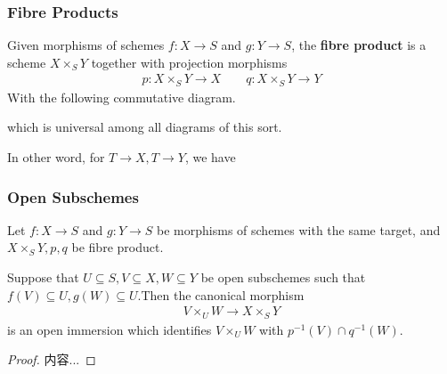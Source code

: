 \documentclass[Total.tex]{subfiles}
\begin{document}
				\subsubsection{Fibre Products}
					\begin{Def}
						Given morphisms of schemes $f:X\rightarrow S$ and $g:Y\rightarrow S$, the \textbf{fibre product} is a scheme $X\times_S Y$ together with projection morphisms
						\begin{gather*}
							p:X\times_S Y\rightarrow X\qquad q:X\times_S Y\rightarrow Y
						\end{gather*}
						With the following commutative diagram.
						\begin{center}
						\end{center}
						which is universal among all diagrams of this sort.
					\end{Def}
					In other word, for $T\rightarrow X,T\rightarrow Y$, we have 
					\begin{center}
					\end{center}
					\subsubsection{Open Subschemes}
					\begin{proposition}
						Let $f:X\rightarrow S$ and $g:Y\rightarrow S$ be morphisms of schemes with the same target, and $X\times_S Y,p,q$ be fibre product.
						
						 Suppose that $U\subseteq S,V\subseteq X,W\subseteq Y$ be open subschemes such that $f(V)\subseteq U,g(W)\subseteq U$.Then the canonical morphism
						 \begin{gather*}
						 	V\times_U W\rightarrow X\times_S Y
						 \end{gather*}
						 is an open immersion which identifies $V\times_U W$ with $p^{-1}(V)\cap q^{-1}(W)$.
					\end{proposition}
					\begin{proof}
						内容...
					\end{proof}
					
\end{document}
